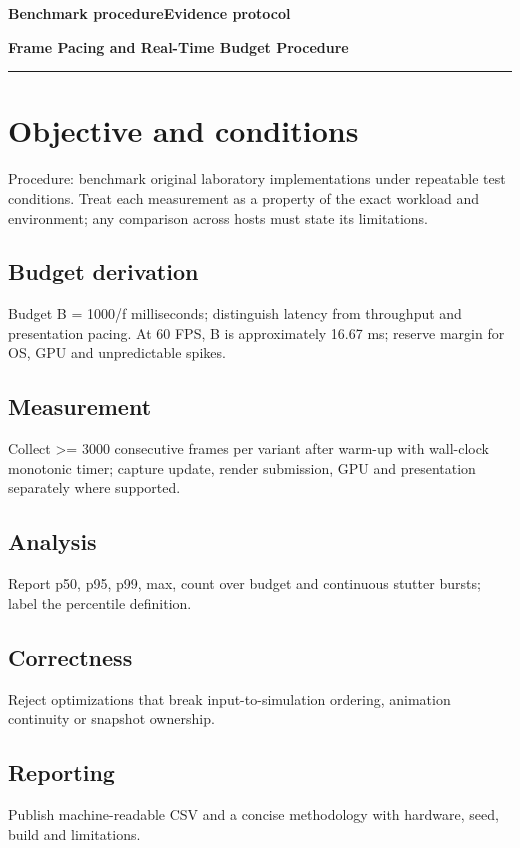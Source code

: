 \documentclass[11pt,letterpaper]{article}
\newcommand{\DocType}{Reference}
\newcommand{\SuiteHeading}[3]{%
\renewcommand{\DocType}{#2}%
{\small\bfseries\sffamily\color{EngineTeal}#2\hfill #3}\par\vspace{6pt}
{\LARGE\bfseries\color{EngineBlue}#1}\par\vspace{4pt}
{\color{EngineTeal}\rule{\linewidth}{1pt}}\par\vspace{7pt}}
\begin{document}
\SuiteHeading{Frame Pacing and Real-Time Budget Procedure}{Benchmark procedure}{Evidence protocol}
\section{Objective and conditions}
Procedure: benchmark original laboratory implementations under repeatable test conditions. Treat each measurement as a property of the exact workload and environment; any comparison across hosts must state its limitations.

\subsection{Budget derivation}
Budget B = 1000/f milliseconds; distinguish latency from throughput and presentation pacing. At 60 FPS, B is approximately 16.67 ms; reserve margin for OS, GPU and unpredictable spikes.

\subsection{Measurement}
Collect >= 3000 consecutive frames per variant after warm-up with wall-clock monotonic timer; capture update, render submission, GPU and presentation separately where supported.

\subsection{Analysis}
Report p50, p95, p99, max, count over budget and continuous stutter bursts; label the percentile definition.

\subsection{Correctness}
Reject optimizations that break input-to-simulation ordering, animation continuity or snapshot ownership.

\subsection{Reporting}
Publish machine-readable CSV and a concise methodology with hardware, seed, build and limitations.
\end{document}
